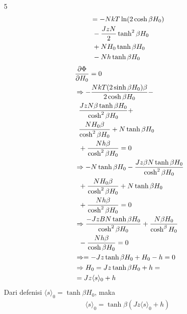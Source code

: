 \documentclass[a4paper  , 6 pt]{article}
\begin{document}
\begin{tiny}
\begin{multicols} {5}
\begin{align}
&=   - N kT \ln (2 \cosh \beta H_0 ) \nonumber \\
&  \hspace{0.1 cm} - \frac{Jz N}{2} \tanh^2 \beta H_0 \nonumber \\
& \hspace{0.1 cm}  + NH_0 \tanh \beta H_0  \nonumber \\
& \hspace{0.1 cm} - Nh \tanh \beta H_0 
\end{align}
\begin{align}
&\frac{\partial \Phi }{\partial H_0  } = 0 \nonumber \\
& \Rightarrow  - \frac{NkT (2 \sinh \beta H_0 ) \beta }{2 \cosh \beta H_0 } - \nonumber \\
&\hspace{0.2 cm }  \frac{J z N \beta  \tanh \beta H_0 }{\cosh^2 \beta H_0 } + \nonumber \\
&  \hspace{0.2 cm}\frac{N H_0 \beta }{\cosh^2 \beta H_0 } + N \tanh \beta H_0 \nonumber \\
& \hspace{0.2 cm } + \frac{N h \beta }{\cosh^2 \beta H_0 } = 0 \nonumber \\
& \Rightarrow - N \tanh \beta H_0  - \frac{Jz \beta N \tanh \beta H_0 }{\cosh^2 \beta H_0 } \nonumber \\
& \hspace{0.2 cm } + \frac{N H_0 \beta }{\cosh^2 \beta H_0 } + N \tanh \beta H_0  \nonumber \\
& \hspace{0.2 cm} +  \frac{N h \beta }{\cosh^2  \beta H_0 } = 0 \nonumber \\
&\Rightarrow  \frac{- Jz B N \tanh \beta H_0 }{\cosh^2 \beta H_0 } + \frac{N \beta H_0 }{\cosh^ \beta H_0 }  \nonumber  \\
& \hspace{0.2 cm}  - \frac{N h \beta }{\cosh \beta H_0 } = 0 \nonumber \\
& \Rightarrow = - J z \tanh \beta H_0  + H_0  - h  = 0 \nonumber \\ 
& \Rightarrow     H_0 =  Jz \tanh \beta H_0  + h  =  \nonumber \\
\hspace{0.2 cm } & = Jz \langle s \rangle_0 + h 
\end{align}
Dari defenisi $\langle s \rangle_0  = \tanh \beta H_0 $, maka 
\begin{align}
\langle s \rangle_0  = \tanh \beta (Jz \langle s \rangle_0  + h )

\end{align}
\end{multicols}
\end{tiny}
\end{document}
